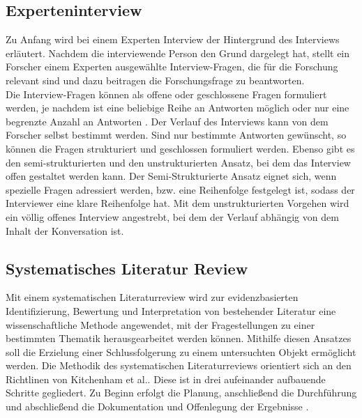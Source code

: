     \subsection{Experteninterview}
    \label{subsec:experteninterview}
        Zu Anfang wird bei einem Experten Interview der Hintergrund des Interviews erläutert. Nachdem die interviewende 
        Person den Grund dargelegt hat, stellt ein Forscher einem Experten ausgewählte Interview-Fragen, die für die 
        Forschung relevant sind und dazu beitragen die Forschungsfrage zu beantworten.
        \\
        \linebreak
        Die Interview-Fragen können als offene oder geschlossene Fragen formuliert werden, je nachdem ist eine beliebige Reihe 
        an Antworten möglich oder nur eine begrenzte Anzahl an Antworten \cite{robson2002real}. Der Verlauf des Interviews 
        kann von dem Forscher selbst bestimmt werden. Sind nur bestimmte Antworten gewünscht, so können die Fragen strukturiert und 
        geschlossen formuliert werden. Ebenso gibt es den semi-strukturierten und den unstrukturierten Ansatz, bei dem das Interview 
        offen gestaltet werden kann. Der Semi-Strukturierte Ansatz eignet sich, wenn spezielle Fragen adressiert werden, bzw. eine 
        Reihenfolge festgelegt ist, sodass der Interviewer eine klare Reihenfolge hat. Mit dem unstrukturierten Vorgehen wird 
        ein völlig offenes Interview angestrebt, bei dem der Verlauf abhängig von dem Inhalt der Konversation ist.


    \subsection{Systematisches Literatur Review}
    \label{subsec:systematischesliteraturreview}
        Mit einem systematischen Literaturreview wird zur evidenzbasierten Identifizierung, Bewertung und Interpretation  
        von bestehender Literatur eine wissenschaftliche Methode angewendet, mit der Fragestellungen zu einer bestimmten Thematik 
        herausgearbeitet werden können. Mithilfe diesen Ansatzes soll die Erzielung einer Schlussfolgerung zu einem untersuchten Objekt 
        ermöglicht werden. 
        Die Methodik des systematischen Literaturreviews orientiert sich an den Richtlinen von Kitchenham et al.. Diese ist in drei 
        aufeinander aufbauende Schritte gegliedert. Zu Beginn erfolgt die Planung, anschließend die Durchführung und abschließend die 
        Dokumentation und Offenlegung der Ergebnisse \cite{Kitchenham2007}.

